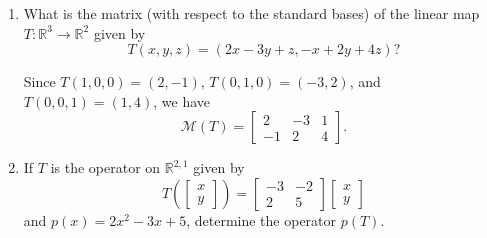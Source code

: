 \documentclass[12pt]{article}
\newcommand{\points}[1]{\marginpar{\hspace{24pt}[#1]}}
\newcommand{\R}{\mathbb{R}}
\begin{document}
\begin{enumerate}
\begin{enumerate}
\bigskip

 \item What is the matrix (with respect to the standard bases) of the linear map $T:\R^3\to\R^2$ given by \points{3}
\[
 T(x,y,z) = (2x-3y+z,-x+2y+4z)?
\]

\bigskip

Since $T(1,0,0) = (2,-1)$, $T(0,1,0)=(-3,2)$, and $T(0,0,1) = (1,4)$, we have
\[
 \mathcal{M}(T) = \begin{bmatrix}2&-3&1\\-1&2&4\end{bmatrix}.
\]

\bigskip

\item If $T$ is the operator on $\R^{2,1}$ given by
\[
 T\left(\begin{bmatrix}x\\y\end{bmatrix}\right) = \begin{bmatrix}-3&-2\\2&5\end{bmatrix}\begin{bmatrix}x\\y\end{bmatrix}
\]
 and $p(x) = 2x^2-3x+5$, determine the operator $p(T)$. \points{4}

\bigskip


\end{enumerate}
\end{enumerate}
\end{document}
